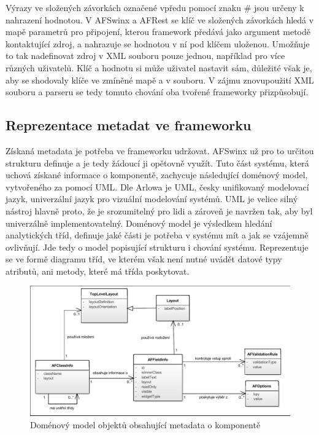 Výrazy ve složených závorkách označené vpředu pomocí znaku \# jsou určeny k nahrazení hodnotou. V AFSwinx a AFRest \cite{tomasek-thesis} se klíč ve složených závorkách hledá v mapě parametrů pro připojení, kterou framework předává jako argument metodě kontaktující zdroj, a nahrazuje se hodnotou v ní pod klíčem uloženou. Umožňuje to tak nadefinovat zdroj v XML souboru pouze jednou, například pro více různých uživatelů. Klíč a hodnotu si může uživatel nastavit sám, důležité však je, aby se shodovaly klíče ve zmíněné mapě a v souboru. V zájmu znovupoužití XML souboru a parseru se tedy tomuto chování oba tvořené frameworky přizpůsobují.

\subsection{Reprezentace metadat ve frameworku}
Získaná metadata je potřeba ve frameworku udržovat. AFSwinx už pro to určitou strukturu definuje \cite{tomasek-thesis} a je tedy žádoucí ji opětovně využít. Tuto část systému, která uchová získané informace o komponentě, zachycuje následující doménový model, vytvořeného za pomocí UML. Dle Arlowa \cite{UmlArlow} je UML, česky unifikovaný modelovací jazyk, univerzální jazyk pro vizuální modelování systémů. UML je velice silný nástroj hlavně proto, že je srozumitelný pro lidi a zároveň je navržen tak, aby byl univerzálně implementovatelný. Doménový model je výsledkem hledání analytických tříd, definuje jaké části je potřeba v systému mít a jak se vzájemně ovlivňují. Jde tedy o model popisující strukturu i chování systému. Reprezentuje se ve formě diagramu tříd, ve kterém však není nutné uvádět datové typy atributů, ani metody, které má třída poskytovat.

\begin{figure}[h!]
\includegraphics[width=\textwidth, trim=1 1 1 1, clip]{figures/domainModel}
\caption{Doménový model objektů obsahující metadata o komponentě}
\label{img:metadataModel}
\end{figure}

